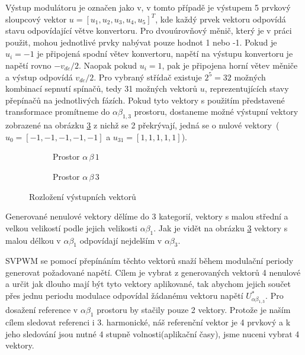 Výstup modulátoru je označen jako v, v tomto  případě je výstupem 5 prvkový sloupcový vektor $u=[u_1, u_2,u_3,u_4,u_5]^T$, kde každý prvek vektoru odpovídá stavu odpovídající větve konvertoru. Pro dvouúrovňový měnič, který je v práci použit,  mohou jednotlivé prvky nabývat pouze hodnot  1 nebo -1. Pokud je $u_i= -1$ je připojená spodní větev konvertoru, napětí na výstupu konvertoru je napětí rovno $-v_{dc}/2$. Naopak pokud $u_i= 1$, pak je připojena horní větev měniče a výstup odpovídá $v_{dc}/2$. Pro vybraný střídač existuje $2^5 = 32$ možných kombinací sepnutí spínačů, tedy 31 možných vektorů $u$, reprezentujících stavy přepínačů na jednotlivých fázích. Pokud tyto vektory s použitím představené transformace promítneme do $\alpha \beta_{1,3}$ prostoru, dostaneme možné výstupní vektory zobrazené na obrázku \ref{fig:svm} z nichž se 2 překrývají, jedná se o nulové vektory~($u_0=[-1,-1,-1,-1,-1]$ a $ u_{31}=[1,1,1,1,1]$).\cite{petros}\cite{analyseOfMultiphase}\cite{letadla}

\begin{figure}[htbp]
     \centering
     \begin{subfigure}[b]{0.45\textwidth}
         \centering
         
         \caption{Prostor $\alpha \, \beta \,1$ }
         \label{fig:svm ab 1}
     \end{subfigure}
     \hfill %
     \begin{subfigure}[b]{0.45\textwidth}
         \centering
            
         \caption{Prostor $\alpha \, \beta \,3$}
         \label{fig:svm ab 3}
     \end{subfigure}
     
     
    \caption{Rozložení výstupních vektorů }
    \label{fig:svm}
\end{figure}

Generované nenulové vektory dělíme do 3 kategorií, vektory s malou střední a velkou velikostí podle jejich velikosti $\alpha \beta_1$. Jak je vidět na obrázku \ref{fig:svm} vektory s malou délkou v $\alpha \beta_1$ odpovídají nejdelším v $\alpha\beta_3$.\cite{analyseOfMultiphase}

SVPWM se pomocí přepínáním těchto vektorů snaží během modulační periody generovat požadované napětí. Cílem je vybrat z generovaných vektorů 4 nenulové a určit jak dlouho mají být tyto vektory aplikované, tak abychom jejich součet přes jednu periodu modulace odpovídal žádanému vektoru napětí $U_{\alpha \beta_{1,3}}^*$. Pro dosažení reference v $\alpha \beta_1$ prostoru by stačily pouze 2 vektory. Protože je naším cílem sledovat referenci i 3. harmonické, náš referenční vektor je 4 prvkový a k jeho sledování jsou nutné 4 stupně volnosti(aplikační časy), jsme nuceni vybrat 4 vektory.\cite{petros}\cite{analyseOfMultiphase}\cite{letadla}

